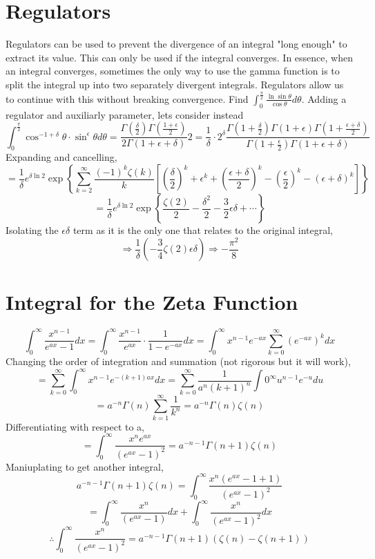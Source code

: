 \documentclass[../main.tex]{subfiles}
\begin{document}
\section{Regulators}
    Regulators can be used to prevent the divergence of an integral "long enough" to extract its value. This can only be used if the integral converges.
    In essence, when an integral converges, sometimes the only way to use the gamma function is to split the integral up into two separately divergent integrals.
    Regulators allow us to continue with this without breaking convergence.
    Find $\int_{0}^{\frac{\pi}{2}}\frac{\ln\sin\theta}{\cos\theta}d\theta$. Adding a regulator and auxiliarly parameter, lets consider instead
    $$\int_{0}^{\frac{\pi}{2}}\cos^{-1+\delta}\theta\cdot\sin^{\epsilon}\theta d\theta=\frac{\Gamma(\frac{\delta}{2})\Gamma(\frac{1+\epsilon}{2})}{2\Gamma(1+\epsilon+\delta)}{2}=\frac{1}{\delta}\cdot 2^{\delta}\frac{\Gamma(1+\frac{\delta}{2})\Gamma(1+\epsilon)\Gamma(1+\frac{\epsilon+\delta}{2})}{\Gamma(1+\frac{\epsilon}{2})\Gamma(1+\epsilon+\delta)}$$
    Expanding and cancelling,
    $$=\frac{1}{\delta}e^{\delta\ln 2}\exp\left\{\sum_{k=2}^{\infty}\frac{(-1)^{k}\zeta(k)}{k}\left[\left(\frac{\delta}{2}\right)^{k}+\epsilon^{k}+\left(\frac{\epsilon+\delta}{2}\right)^{k}-\left(\frac{\epsilon}{2}\right)^{k}-(\epsilon+\delta)^{k}\right]\right\}$$
    $$=\frac{1}{\delta}e^{\delta\ln 2}\exp\left\{\frac{\zeta(2)}{2}-\frac{\delta^{2}}{2}-\frac{3}{2}\epsilon\delta+\cdots\right\}$$
    Isolating the $\epsilon\delta$ term as it is the only one that relates to the original integral,
    $$\Rightarrow\frac{1}{\delta}\left(-\frac{3}{4}\zeta(2)\epsilon\delta\right)\Rightarrow-\frac{\pi^{2}}{8}$$

\section{Integral for the Zeta Function}
    $$\int_{0}^{\infty}\frac{x^{n-1}}{e^{ax}-1}dx=\int_{0}^{\infty}\frac{x^{n-1}}{e^{ax}}\cdot\frac{1}{1-e^{-ax}}dx=\int_{0}^{\infty}x^{n-1}e^{-ax}\sum_{k=0}^{\infty}(e^{-ax})^{k}dx$$
    Changing the order of integration and summation (not rigorous but it will work),
    $$=\sum_{k=0}^{\infty}\int_{0}^{\infty}x^{n-1}e^{-(k+1)ax}dx=\sum_{k=0}^{\infty}\frac{1}{a^{n}(k+1)^{n}}\int{0}^{\infty}u^{n-1}e^{-u}du$$
    $$=a^{-n}\Gamma(n)\sum_{k=1}^{\infty}\frac{1}{k^{n}}=a^{-n}\Gamma(n)\zeta(n)$$
    Differentiating with respect to a,
    $$=\int_{0}^{\infty}\frac{x^{n}e^{ax}}{(e^{ax}-1)^{2}}=a^{-n-1}\Gamma(n+1)\zeta(n)$$
    Maniuplating to get another integral,
    $$a^{-n-1}\Gamma(n+1)\zeta(n)=\int_{0}^{\infty}\frac{x^{n}(e^{ax}-1+1)}{(e^{ax}-1)^{2}}$$
    $$=\int_{0}^{\infty}\frac{x^{n}}{(e^{ax}-1)}dx+\int_{0}^{\infty}\frac{x^{n}}{(e^{ax}-1)^{2}}dx$$
    $$\therefore \int_{0}^{\infty}\frac{x^{n}}{(e^{ax}-1)^{2}}=a^{-n-1}\Gamma(n+1)(\zeta(n)-\zeta(n+1))$$
\end{document}
